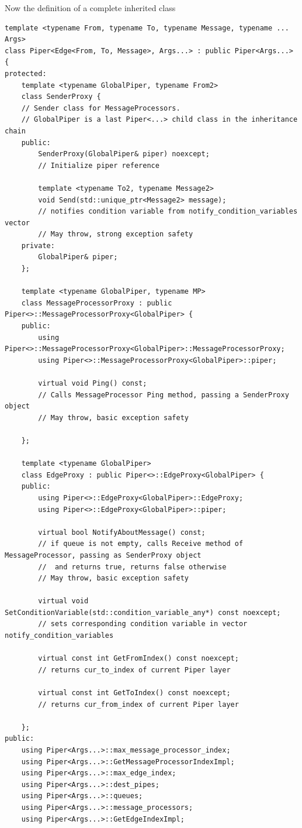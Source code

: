 \documentclass{article}
\begin{document}
Now the definition of a complete inherited class
\begin{lstlisting}
template <typename From, typename To, typename Message, typename ... Args>
class Piper<Edge<From, To, Message>, Args...> : public Piper<Args...> {
protected:
	template <typename GlobalPiper, typename From2>
	class SenderProxy {
	// Sender class for MessageProcessors.
	// GlobalPiper is a last Piper<...> child class in the inheritance chain
	public:
		SenderProxy(GlobalPiper& piper) noexcept;
		// Initialize piper reference

		template <typename To2, typename Message2>
		void Send(std::unique_ptr<Message2> message);
		// notifies condition variable from notify_condition_variables vector
		// May throw, strong exception safety
	private:
		GlobalPiper& piper;
	};

	template <typename GlobalPiper, typename MP>
	class MessageProcessorProxy : public Piper<>::MessageProcessorProxy<GlobalPiper> {
	public:
		using Piper<>::MessageProcessorProxy<GlobalPiper>::MessageProcessorProxy;
		using Piper<>::MessageProcessorProxy<GlobalPiper>::piper;

		virtual void Ping() const;
		// Calls MessageProcessor Ping method, passing a SenderProxy object
		// May throw, basic exception safety

	};

	template <typename GlobalPiper>
	class EdgeProxy : public Piper<>::EdgeProxy<GlobalPiper> {
	public:
		using Piper<>::EdgeProxy<GlobalPiper>::EdgeProxy;
		using Piper<>::EdgeProxy<GlobalPiper>::piper;

		virtual bool NotifyAboutMessage() const;
		// if queue is not empty, calls Receive method of MessageProcessor, passing as SenderProxy object
		//	and returns true, returns false otherwise
		// May throw, basic exception safety

		virtual void SetConditionVariable(std::condition_variable_any*) const noexcept;
		// sets corresponding condition variable in vector notify_condition_variables

		virtual const int GetFromIndex() const noexcept;
		// returns cur_to_index of current Piper layer

		virtual const int GetToIndex() const noexcept;
		// returns cur_from_index of current Piper layer

	};
public:
	using Piper<Args...>::max_message_processor_index;
	using Piper<Args...>::GetMessageProcessorIndexImpl;
	using Piper<Args...>::max_edge_index;
	using Piper<Args...>::dest_pipes;
	using Piper<Args...>::queues;
	using Piper<Args...>::message_processors;
	using Piper<Args...>::GetEdgeIndexImpl;


\end{lstlisting}
\end{document}

